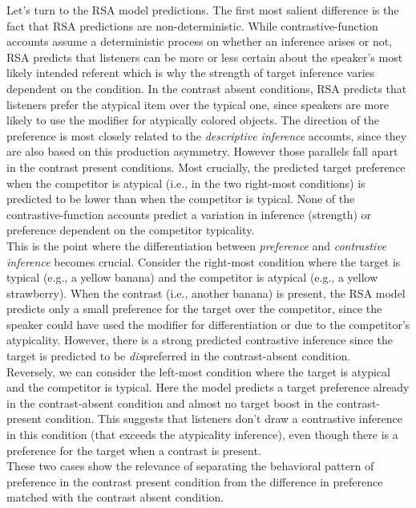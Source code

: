 \documentclass[a4paper,man,floatsintext,natbib]{apa6}
\begin{document}
Let's turn to the RSA model predictions. The first most salient difference is the fact that RSA predictions are non-deterministic. While contrastive-function accounts assume a deterministic process on whether an inference arises or not, RSA predicts that listeners can be more or less certain about the speaker's most likely intended referent which is why the strength of target inference varies dependent on the condition. 
In the contrast absent conditions, RSA predicts that listeners prefer the atypical item over the typical one, since speakers are more likely to use the modifier for atypically colored objects. The direction of the preference is most closely related to the \emph{descriptive inference} accounts, since they are also based on this production asymmetry. However those parallels fall apart in the contrast present conditions. Most crucially, the predicted target preference when the competitor is atypical (i.e., in the two right-most conditions) is predicted to be lower than when the competitor is typical. None of the contrastive-function accounts predict a variation in inference (strength) or preference dependent on the competitor typicality.\\
This is the point where the differentiation between \emph{preference} and \emph{contrastive inference} becomes crucial. Consider the right-most condition where the target is typical (e.g., a yellow banana) and the competitor is atypical (e.g., a yellow strawberry). When the contrast (i.e., another banana) is present, the RSA model predicts only a small preference for the target over the competitor, since the speaker could have used the modifier for differentiation or due to the competitor's atypicality. However, there is a strong predicted contrastive inference since the target is predicted to be \emph{dis}preferred in the contrast-absent condition.\\
Reversely, we can consider the left-most condition where the target is atypical and the competitor is typical. Here the model predicts a target preference already in the contrast-absent condition and almost no target boost in the contrast-present condition. This suggests that listeners don't draw a contrastive inference in this condition (that exceeds the atypicality inference), even though there is a preference for the target when a contrast is present.\\
These two cases show the relevance of separating the behavioral pattern of preference in the contrast present condition from the difference in preference matched with the contrast absent condition.
\end{document}
